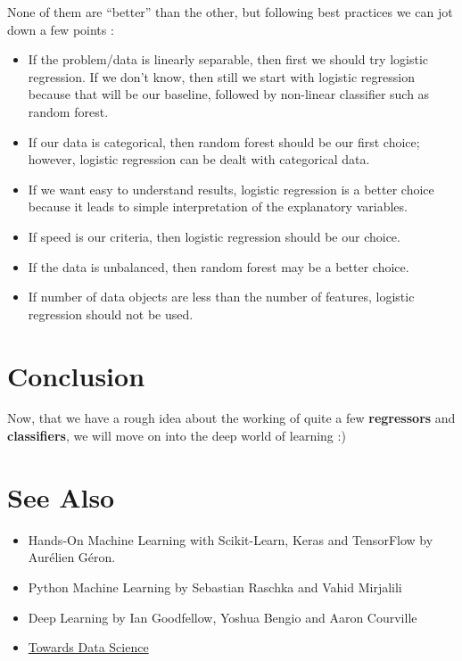 \documentclass[11pt, a4paper]{book}
\begin{document}
None of them are ``better'' than the other, but following best practices
we can jot down a few points :

\begin{itemize}
\item
  If the problem/data is linearly separable, then first we should try
  logistic regression. If we don't know, then still we start with
  logistic regression because that will be our baseline, followed by
  non-linear classifier such as random forest.
\item
  If our data is categorical, then random forest should be our first
  choice; however, logistic regression can be dealt with categorical
  data.
\item
  If we want easy to understand results, logistic regression is a better
  choice because it leads to simple interpretation of the explanatory
  variables.
\item
  If speed is our criteria, then logistic regression should be our
  choice.
\item
  If the data is unbalanced, then random forest may be a better choice.
\item
  If number of data objects are less than the number of features,
  logistic regression should not be used.
\end{itemize}

    \hypertarget{conclusion}{%
\section{Conclusion}\label{conclusion}}

Now, that we have a rough idea about the working of quite a few
\textbf{regressors} and \textbf{classifiers}, we will move on into the
deep world of learning :)

\hypertarget{references}{%
\section{See Also}\label{references}}

\begin{itemize}
    \item 
        Hands-On Machine Learning with Scikit-Learn, Keras and TensorFlow by Aurélien Géron.
    \item
        Python Machine Learning by Sebastian Raschka and Vahid Mirjalili
    \item
        Deep Learning by Ian Goodfellow, Yoshua Bengio and Aaron Courville
    \item 
        \href{https://towardsdatascience.com/}{Towards Data Science}
\end{itemize}



    
    
    
\end{document}
